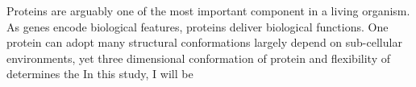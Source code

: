 Proteins are arguably one of the most important component in a living organism. As genes encode biological features, proteins deliver biological functions. One protein can adopt many structural conformations largely depend on sub-cellular environments, yet three dimensional conformation of protein and flexibility of  determines the     In this study, I will be 